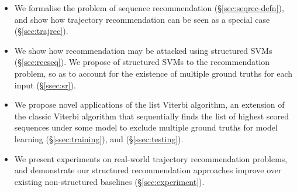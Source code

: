 \begin{itemize}[noitemsep,leftmargin=12pt]\itemmoveup
	\item We formalise the problem of sequence recommendation (\S\ref{sec:seqrec-defn}), and show how trajectory recommendation can be seen as a special case (\S\ref{sec:trajrec}).

	\item We show how  recommendation may be attacked using structured SVMs (\S\ref{sec:recseq}).
	We propose  of structured SVMs to the recommendation problem, so as to account for the existence of multiple ground truths for each input (\S\ref{ssec:sr}).

    \item We propose  novel applications of the list Viterbi algorithm, an extension of the classic Viterbi algorithm that sequentially finds the list of highest scored sequences under some model
to exclude multiple ground truths for model learning (\S\ref{ssec:training}),
and  (\S\ref{ssec:testing}).
	
	\item We present experiments on real-world trajectory recommendation problems, and demonstrate our structured recommendation approaches improve over existing non-structured baselines (\S\ref{sec:experiment}).\itemmoveup
\end{itemize}

